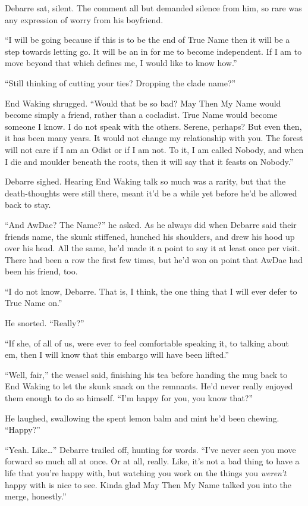 Debarre sat, silent. The comment all but demanded silence from him, so rare was any expression of worry from his boyfriend.

``I will be going because if this is to be the end of True Name then it will be a step towards letting go. It will be an in for me to become independent. If I am to move beyond that which defines me, I would like to know how.''

``Still thinking of cutting your ties? Dropping the clade name?''

End Waking shrugged. ``Would that be so bad? May Then My Name would become simply a friend, rather than a cocladist. True Name would become someone I know. I do not speak with the others. Serene, perhaps? But even then, it has been many years. It would not change my relationship with you. The forest will not care if I am an Odist or if I am not. To it, I am called Nobody, and when I die and moulder beneath the roots, then it will say that it feasts on Nobody.''

Debarre sighed. Hearing End Waking talk so much was a rarity, but that the death-thoughts were still there, meant it'd be a while yet before he'd be allowed back to stay.

``And AwDae? The Name?'' he asked. As he always did when Debarre said their friends name, the skunk stiffened, hunched his shoulders, and drew his hood up over his head. All the same, he'd made it a point to say it at least once per visit. There had been a row the first few times, but he'd won on point that AwDae had been his friend, too.

``I do not know, Debarre. That is, I think, the one thing that I will ever defer to True Name on.''

He snorted. ``Really?''

``If she, of all of us, were ever to feel comfortable speaking it, to talking about em, then I will know that this embargo will have been lifted.''

``Well, fair,'' the weasel said, finishing his tea before handing the mug back to End Waking to let the skunk snack on the remnants. He'd never really enjoyed them enough to do so himself. ``I'm happy for you, you know that?''

He laughed, swallowing the spent lemon balm and mint he'd been chewing. ``Happy?''

``Yeah. Like\ldots{}'' Debarre trailed off, hunting for words. ``I've never seen you move forward so much all at once. Or at all, really. Like, it's not a bad thing to have a life that you're happy with, but watching you work on the things you \emph{weren't} happy with is nice to see. Kinda glad May Then My Name talked you into the merge, honestly.''

